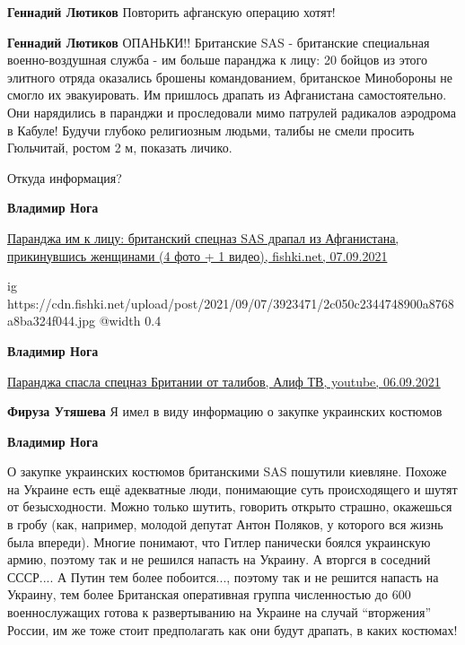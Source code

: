\begin{itemize}
\begin{itemize} %
\textbf{Геннадий Лютиков} Повторить афганскую операцию хотят!

\textbf{Геннадий Лютиков} ОПАНЬКИ!! Британские SAS - британские специальная военно-воздушная служба - им больше паранджа к лицу: 20 бойцов из этого элитного отряда оказались брошены командованием, британское Минобороны не смогло их эвакуировать. Им пришлось драпать из Афганистана самостоятельно. Они нарядились в паранджи и проследовали мимо патрулей радикалов аэродрома в Кабуле! Будучи глубоко религиозным людьми, талибы не смели просить Гюльчитай, ростом 2 м, показать личико.

Откуда информация?

\textbf{Владимир Нога}

\href{https://fishki.net/3923471-parandzha-im-k-licu-britanskij-specnaz-sas-drapal-iz-afganistana-prikinuvshisy-zhenwinami.html/gallery-9816793/}{%
Паранджа им к лицу: британский спецназ SAS драпал из Афганистана, прикинувшись женщинами (4 фото + 1 видео), %
fishki.net, 07.09.2021%
}

\ifcmt
  ig https://cdn.fishki.net/upload/post/2021/09/07/3923471/2c050c2344748900a8768a8ba324f044.jpg
  @width 0.4
\fi

\textbf{Владимир Нога}

\href{https://youtu.be/HCqKMhvEMto}{%
Паранджа спасла спецназ Британии от талибов, Алиф ТВ, youtube, 06.09.2021%
}

\textbf{Фируза Утяшева} Я имел в виду информацию о закупке украинских костюмов

\textbf{Владимир Нога} 

О закупке украинских костюмов британскими SAS пошутили киевляне. Похоже на
Украине есть ещё адекватные люди, понимающие суть происходящего и шутят от
безысходности. Можно только шутить, говорить открыто страшно, окажешься в гробу
(как, например, молодой депутат Антон Поляков, у которого вся жизнь была
впереди). Многие понимают, что Гитлер панически боялся украинскую армию,
поэтому так и не решился напасть на Украину. А вторгся в соседний СССР.... А
Путин тем более побоится..., поэтому так и не решится напасть на Украину, тем
более Британская оперативная группа численностью до 600 военнослужащих готова к
развертыванию на Украине на случай \enquote{вторжения} России, им же тоже стоит
предполагать как они будут драпать, в каких костюмах!

\end{itemize} %

\end{itemize} %
